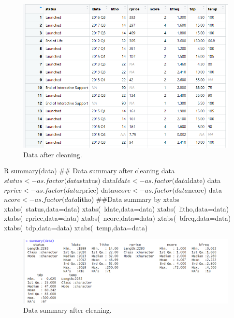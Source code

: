 \begin{figure}[H]
    \centering
    \includegraphics[max width=0.6\linewidth]{graphics/new_graphics/New data/Data-after.png}
    \caption{Data after cleaning.}
\end{figure}
\begin{code}{R}
    summary(data) ## Data summary after cleaning
    data$status<-as.factor(data$status)
    data$ldate<-as.factor(data$ldate)
    data$rprice<-as.factor(data$rprice)
    data$ncore<-as.factor(data$ncore)
    data$ncore<-as.factor(data$litho)
    ##Data summary by xtabs    
    xtabs(~status,data=data)
    xtabs(~ldate,data=data)
    xtabs(~litho,data=data)
    xtabs(~rprice,data=data)
    xtabs(~ncore,data=data)
    xtabs(~bfreq,data=data)
    xtabs(~tdp,data=data)
    xtabs(~temp,data=data)
\end{code}
\begin{figure}[H]
    \centering
    \includegraphics[max width=0.7\linewidth]{graphics/new_graphics/New data/summary-of-data-after.png}
    \caption{Data summary after cleaning.}
\end{figure}
